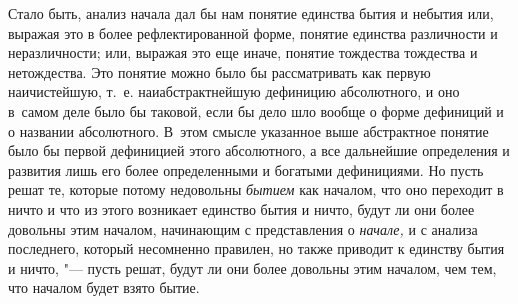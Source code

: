Стало быть, анализ начала дал бы нам понятие единства бытия и небытия или,
выражая это в более рефлектированной форме, понятие единства различности и
неразличности; или, выражая это еще иначе, понятие тождества тождества и
нетождества. Это понятие можно было бы рассматривать
как первую наичистейшую, т.~е. наиабстрактнейшую дефиницию абсолютного, и оно
в~самом деле было бы таковой, если бы дело шло вообще о форме дефиниций и о
названии абсолютного. В~этом смысле указанное выше абстрактное понятие было бы
первой дефиницией этого абсолютного, а все дальнейшие определения и развития
лишь его более определенными и богатыми дефинициями. Но пусть решат те, которые
потому недовольны {\em бытием} как началом, что оно переходит в ничто и что из
этого возникает единство бытия и ничто, будут ли они более довольны этим
началом, начинающим с представления о {\em начале,} и с анализа последнего,
который несомненно правилен, но также приводит к единству бытия и ничто, "---
пусть решат, будут ли они более довольны этим началом, чем тем, что началом
будет взято бытие.

